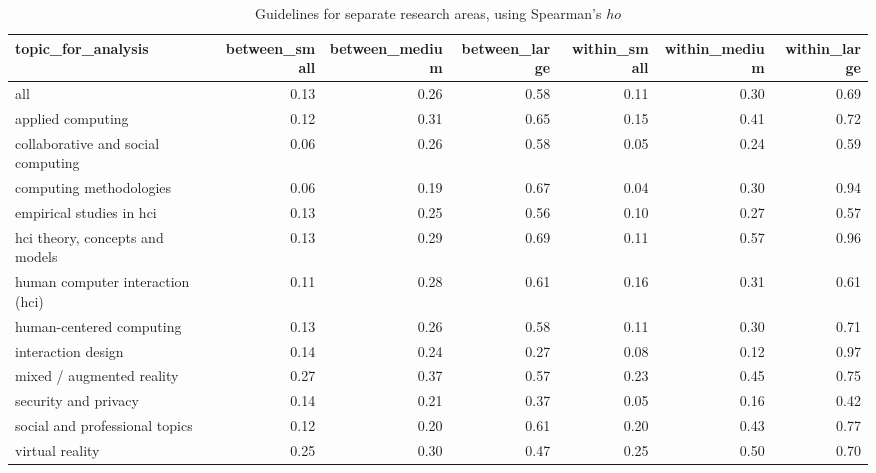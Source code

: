 \begin{table}[ht]
\centering
\begin{tabular}{lrrrrrr}
  \hline
topic\_for\_analysis & between\_small & between\_medium & between\_large & within\_small & within\_medium & within\_large \\ 
  \hline
all & 0.13 & 0.26 & 0.58 & 0.11 & 0.30 & 0.69 \\ 
  applied computing & 0.12 & 0.31 & 0.65 & 0.15 & 0.41 & 0.72 \\ 
  collaborative and social computing & 0.06 & 0.26 & 0.58 & 0.05 & 0.24 & 0.59 \\ 
  computing methodologies & 0.06 & 0.19 & 0.67 & 0.04 & 0.30 & 0.94 \\ 
  empirical studies in hci & 0.13 & 0.25 & 0.56 & 0.10 & 0.27 & 0.57 \\ 
  hci theory, concepts and models & 0.13 & 0.29 & 0.69 & 0.11 & 0.57 & 0.96 \\ 
  human computer interaction (hci) & 0.11 & 0.28 & 0.61 & 0.16 & 0.31 & 0.61 \\ 
  human-centered computing & 0.13 & 0.26 & 0.58 & 0.11 & 0.30 & 0.71 \\ 
  interaction design & 0.14 & 0.24 & 0.27 & 0.08 & 0.12 & 0.97 \\ 
  mixed / augmented reality & 0.27 & 0.37 & 0.57 & 0.23 & 0.45 & 0.75 \\ 
  security and privacy & 0.14 & 0.21 & 0.37 & 0.05 & 0.16 & 0.42 \\ 
  social and professional topics & 0.12 & 0.20 & 0.61 & 0.20 & 0.43 & 0.77 \\ 
  virtual reality & 0.25 & 0.30 & 0.47 & 0.25 & 0.50 & 0.70 \\ 
   \hline
\end{tabular}
\caption{Guidelines for separate research areas, using Spearman's $
ho$} 
\label{tab:es guidelines spearmansrho-es different topics}
\end{table}

